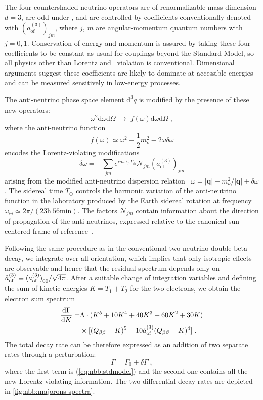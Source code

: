 The four countershaded neutrino operators are of renormalizable mass dimension
$d = 3$, are odd under \cpt, and are controlled by coefficients conventionally
denoted with $(a^{(3)}_\text{of})_{jm}$, where $j$, $m$ are angular-momentum
quantum numbers with $j = 0,1$. Conservation of energy and momentum is assured
by taking these four coefficients to be constant as usual for couplings beyond
the Standard Model, so all physics other than Lorentz and \cpt\ violation is
conventional. Dimensional arguments suggest these coefficients are likely to
dominate at accessible energies and can be measured sensitively in low-energy
processes.

The anti-neutrino phase space element $\text{d}^3q$ is modified by the presence
of these new operators:
\[
  \omega^2\text{d}\omega\text{d}\Omega \;\longmapsto\;
    f(\omega)\text{d}\omega\text{d}\Omega\;,
\]
where the anti-neutrino function
\[
  f(\omega)\simeq\omega^2-\frac{1}{2}m_\nu^2-2\omega\delta\omega
\]
encodes the Lorentz-violating modifications
\[
  \delta\omega = -\sum_{jm} e^{im\omega_\oplus T_\oplus}
    \mathcal{N}_{jm}(a_\text{of}^{(3)})_{jm}
\]
arising from the modified anti-neutrino dispersion
relation~\cite{Kostelecky2012} $\omega = |\mathbf{q}| + m_\nu^2 / |\mathbf{q}|
+ \delta\omega$. The sidereal time $T_\oplus$ controls the harmonic variation
of the anti-neutrino function in the laboratory produced by the Earth sidereal
rotation at frequency $\omega_\oplus \simeq 2\pi/(23\text{h}~56\text{min})$.
The factors $\mathcal{N}_{jm}$ contain information about the direction of
propagation of the anti-neutrinos, expressed relative to the canonical
sun-centered frame of reference~\cite{Bluhm2003, Kostelecky2002}.

Following the same procedure as in the conventional two-neutrino double-beta
decay, we integrate over all orientation, which implies that only isotropic
effects are observable and hence that the residual spectrum depends only on
$\mathring{a}_\text{of}^{(3)}\equiv{(a_\text{of}^{(3)})}_{00}/\sqrt{4\pi}$. After a suitable change of
integration variables and defining the sum of kinetic energies $K=T_1+T_2$ for
the two electrons, we obtain the electron sum spectrum
\begin{equation}\label{eq:nbb:totwidth}
  \begin{split}
    \frac{\text{d}\Gamma}{\text{d}K} = &
      \Lambda \cdot (K^5 + 10K^4 + 40K^3 + 60K^2 + 30K) \\
      & \times[(Q_{\beta\beta} - K)^5 + 10\mathring{a}_\text{of}^{(3)}(Q_{\beta\beta} - K)^4] \;. \\
  \end{split}
\end{equation}
The total decay rate can be therefore expressed as an addition of two separate
rates through a perturbation:
\[
  \Gamma = \Gamma_0 + \delta\Gamma \;,
\]
where the first term is (\ref{eq:nbb:stdmodel}) and the second one contains all the
new Lorentz-violating information. The two differential decay rates are
depicted in \cref{fig:nbb:majorons-spectra}.

